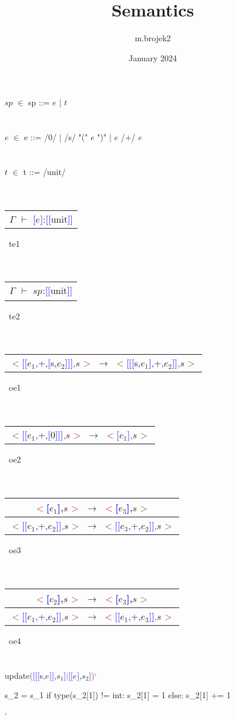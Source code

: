 \documentclass{article}
\title{Semantics}
\author{m.brojek2 }
\date{January 2024}
\newcommand{\tm}[1]{\textcolor{brown}{#1}}
\newcommand{\tmb}[1]{\textcolor{blue}{#1}}
\newcommand{\ntm}[1]{\colorbox{blue!30}{$#1$}}
\newcommand{\osr}[3]{
\begin{tabular}{ c }
 #2 \\
 \hline
 #3
\end{tabular}~{\tiny #1}
}
\begin{document}
\ntm{sp} $\in$ sp ::= \ntm{e}  $|$ \ntm{t} \\
~\\\\\ntm{e} $\in$ e ::= /0/ $|$ /s/ "(" \ntm{e}  ")" $|$ \ntm{e}  /+/ \ntm{e} \\
~\\\\\ntm{t} $\in$ t ::= /unit/\\
~\\\\\osr{te1}{}{\ntm{\Gamma_{}} $\vdash$ \tmb{[}\ntm{e_{}}\tmb{]}:\tmb{[}\tmb{[}unit\tmb{]}\tmb{]}}\\
~\\\\\osr{te2}{}{\ntm{\Gamma_{}} $\vdash$ \ntm{sp_{}}:\tmb{[}\tmb{[}unit\tmb{]}\tmb{]}}\\
~\\\\\osr{oe1}{}{\tm{$<$}\tmb{[}\tmb{[}\ntm{e_{1}}\tmb{,}+\tmb{,}\tmb{[}s\tmb{,}\ntm{e_{2}}\tmb{]}\tmb{]}\tmb{]}\tm{,}\ntm{s_{}}\tm{$>$} $\to$ \tm{$<$}\tmb{[}\tmb{[}\tmb{[}s\tmb{,}\ntm{e_{1}}\tmb{]}\tmb{,}+\tmb{,}\ntm{e_{2}}\tmb{]}\tmb{]}\tm{,}\ntm{s_{}}\tm{$>$}}\\
~\\\\\osr{oe2}{}{\tm{$<$}\tmb{[}\tmb{[}\ntm{e_{1}}\tmb{,}+\tmb{,}\tmb{[}0\tmb{]}\tmb{]}\tmb{]}\tm{,}\ntm{s_{}}\tm{$>$} $\to$ \tm{$<$}\tmb{[}\ntm{e_{1}}\tmb{]}\tm{,}\ntm{s_{}}\tm{$>$}}\\
~\\\\\osr{oe3}{\tm{$<$}\tmb{[}\ntm{e_{1}}\tmb{]}\tm{,}\ntm{s_{}}\tm{$>$} $\to$ \tm{$<$}\tmb{[}\ntm{e_{3}}\tmb{]}\tm{,}\ntm{s_{}}\tm{$>$}}{\tm{$<$}\tmb{[}\tmb{[}\ntm{e_{1}}\tmb{,}+\tmb{,}\ntm{e_{2}}\tmb{]}\tmb{]}\tm{,}\ntm{s_{}}\tm{$>$} $\to$ \tm{$<$}\tmb{[}\tmb{[}\ntm{e_{3}}\tmb{,}+\tmb{,}\ntm{e_{2}}\tmb{]}\tmb{]}\tm{,}\ntm{s_{}}\tm{$>$}}\\
~\\\\\osr{oe4}{\tm{$<$}\tmb{[}\ntm{e_{2}}\tmb{]}\tm{,}\ntm{s_{}}\tm{$>$} $\to$ \tm{$<$}\tmb{[}\ntm{e_{3}}\tmb{]}\tm{,}\ntm{s_{}}\tm{$>$}}{\tm{$<$}\tmb{[}\tmb{[}\ntm{e_{1}}\tmb{,}+\tmb{,}\ntm{e_{2}}\tmb{]}\tmb{]}\tm{,}\ntm{s_{}}\tm{$>$} $\to$ \tm{$<$}\tmb{[}\tmb{[}\ntm{e_{1}}\tmb{,}+\tmb{,}\ntm{e_{3}}\tmb{]}\tmb{]}\tm{,}\ntm{s_{}}\tm{$>$}}\\
~\\\\update\tm{(}\tmb{[}\tmb{[}\tmb{[}s\tmb{,}\ntm{e_{}}\tmb{]}\tmb{]}\tmb{,}\ntm{s_{1}}\tmb{]}\tm{$|$}\tmb{[}\tmb{[}\ntm{e_{}}\tmb{]}\tmb{,}\ntm{s_{2}}\tmb{]}\tm{)}\tm{`}\begin{python}
s_2 = s_1
if type(s_2[1]) != int:
    s_2[1] = 1
else:
    s_2[1] += 1
\end{python}\tm{`}
\end{document}
